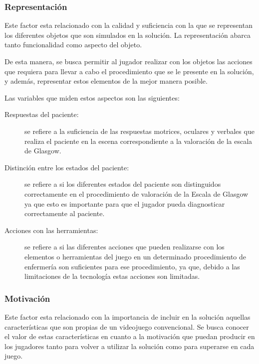 \subsubsection{Representación}
\label{sec:sub_representacion}

Este factor esta relacionado con la calidad y suficiencia con la que se
representan los diferentes objetos que son simulados en la solución. La
representación abarca tanto funcionalidad como aspecto del objeto.

De esta manera, se busca permitir al jugador realizar con los objetos las
acciones que requiera para llevar a cabo el procedimiento que se le presente en
la solución, y además, representar estos elementos de la mejor manera posible.

Las variables que miden estos aspectos son las siguientes:

\begin{description}

\item [Respuestas del paciente:] se refiere a la suficiencia de las respuestas 
    motrices, oculares y verbales que realiza el paciente en la escena 
    correspondiente a la valoración de la escala de Glasgow.

\item[Distinción entre los estados del paciente:] se refiere a si los diferentes
    estados del paciente son distinguidos correctamente en el procedimiento de
    valoración de la Escala de Glasgow ya que esto es importante para que el
    jugador pueda diagnosticar correctamente al paciente.

\item[Acciones con las herramientas:] se refiere a si las diferentes acciones que
    pueden realizarse con los elementos o herramientas del juego en un
    determinado procedimiento de enfermería son suficientes para ese
    procedimiento, ya que, debido a las limitaciones de la tecnología estas
    acciones son limitadas.

\end{description}

\subsubsection{Motivación}
\label{sec:sub_motivacion}

Este factor esta relacionado con la importancia de incluir en la solución
aquellas características que son propias de un videojuego convencional. Se
busca conocer el valor de estas características en cuanto a la motivación que
puedan producir en los jugadores tanto para volver a utilizar la solución como
para superarse en cada juego.

